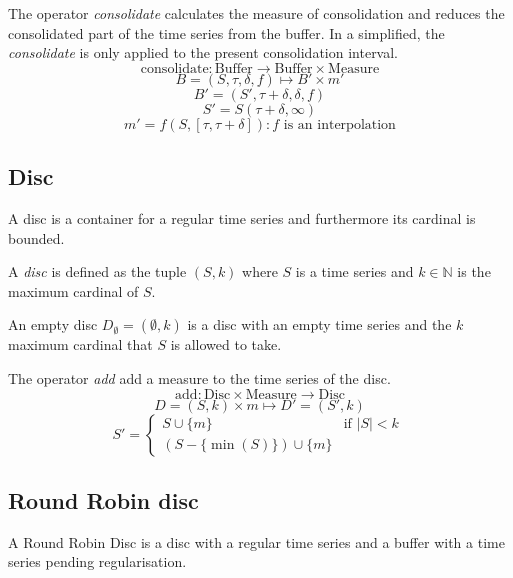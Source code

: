 \begin{definition}
  The operator \emph{consolidate} calculates the measure of
  consolidation and reduces the consolidated part of the time series
  from the buffer. In a simplified, the \emph{consolidate} is only
  applied to the present consolidation interval.
  \[
  \text{consolidate}: \text{Buffer} \longrightarrow \text{Buffer}
  \times \text{Measure}
  \]
  \[
  B=(S,\tau,\delta,f) \mapsto B' \times m'
  \]
  \[
  B'= (S',\tau+\delta,\delta,f)
  \]
  \[
  S' = S(\tau+\delta,\infty)
  \]
  \[
  m' = f(S,[\tau,\tau+\delta]): f \text{ is an interpolation}
  \]
\end{definition}



\subsection{Disc}\label{sec:model:disc}

A disc is a container for a regular time series and furthermore its
cardinal is bounded. 

\begin{definition}[Disc]
  A \emph{disc} is defined as the tuple $(S,k)$ where $S$ is a time
  series and $k\in\mathbb{N}$ is the maximum cardinal of $S$.
\end{definition}

An empty disc $D_{\emptyset} = (\emptyset,k)$ is a disc with an empty
time series and the $k$ maximum cardinal that $S$ is allowed to take.

\begin{definition}
  The operator \emph{add} add a measure to the time series of the disc.
  \[
  \text{add}: \text{Disc} \times \text{Measure} \longrightarrow \text{Disc}
  \]
  \[
  D=(S,k) \times m \mapsto D'= (S',k)
  \]
  \[
  S' =  
  \begin{cases}
      S\cup\{m\} &\text{if }  |S|<k\\
      (S-\{\min(S)\}) \cup \{m\} 
    \end{cases}  \
  \]
\end{definition}


\subsection{Round Robin disc}\label{sec:model:discroundrobin}


A Round Robin Disc is a disc with a regular time series and a buffer
with a time series pending regularisation.

